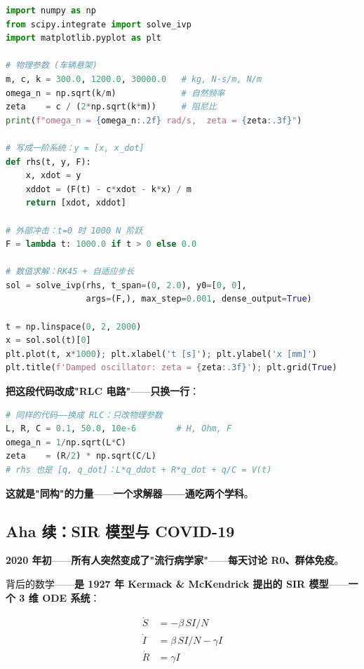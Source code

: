 \begin{lstlisting}[language=Python]
import numpy as np
from scipy.integrate import solve_ivp
import matplotlib.pyplot as plt

# 物理参数 (车辆悬架)
m, c, k = 300.0, 1200.0, 30000.0   # kg, N·s/m, N/m
omega_n = np.sqrt(k/m)             # 自然频率
zeta    = c / (2*np.sqrt(k*m))     # 阻尼比
print(f"omega_n = {omega_n:.2f} rad/s,  zeta = {zeta:.3f}")

# 写成一阶系统：y = [x, x_dot]
def rhs(t, y, F):
    x, xdot = y
    xddot = (F(t) - c*xdot - k*x) / m
    return [xdot, xddot]

# 外部冲击：t=0 时 1000 N 阶跃
F = lambda t: 1000.0 if t > 0 else 0.0

# 数值求解：RK45 + 自适应步长
sol = solve_ivp(rhs, t_span=(0, 2.0), y0=[0, 0],
                args=(F,), max_step=0.001, dense_output=True)

t = np.linspace(0, 2, 2000)
x = sol.sol(t)[0]
plt.plot(t, x*1000); plt.xlabel('t [s]'); plt.ylabel('x [mm]')
plt.title(f'Damped oscillator: zeta = {zeta:.3f}'); plt.grid(True)
\end{lstlisting}

\textbf{把这段代码改成"RLC 电路"}——\textbf{只换一行}：

\begin{lstlisting}[language=Python]
# 同样的代码——换成 RLC：只改物理参数
L, R, C = 0.1, 50.0, 10e-6        # H, Ohm, F
omega_n = 1/np.sqrt(L*C)
zeta    = (R/2) * np.sqrt(C/L)
# rhs 也是 [q, q_dot]：L*q_ddot + R*q_dot + q/C = V(t)
\end{lstlisting}

\textbf{这就是"同构"的力量}——\textbf{一个求解器——通吃两个学科}。

\subsection{Aha 续：SIR 模型与 COVID-19}

\textbf{2020 年初}——\textbf{所有人突然变成了"流行病学家"}——\textbf{每天讨论 R0、群体免疫}。

背后的数学——\textbf{是 1927 年 Kermack \& McKendrick 提出的 SIR 模型}——\textbf{一个 3 维 ODE 系统}：

\begin{align}
\dot{S} &= -\beta \, S I / N \\
\dot{I} &= \beta \, S I / N - \gamma I \\
\dot{R} &= \gamma I
\end{align}

